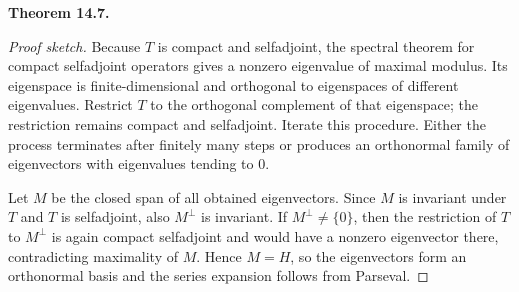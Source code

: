 \documentclass[11pt]{article}
\newenvironment{theoremstmt}[1]{%
  \par\medskip\noindent\textbf{Theorem #1. }\itshape
}{\par\medskip}
\begin{document}
\begin{theoremstmt}{14.7}
\thmHilbertSchmidt
\end{theoremstmt}

\begin{proof}[Proof sketch]
Because $T$ is compact and selfadjoint, the spectral theorem for compact selfadjoint operators gives a nonzero eigenvalue of maximal modulus. Its eigenspace is finite-dimensional and orthogonal to eigenspaces of different eigenvalues. Restrict $T$ to the orthogonal complement of that eigenspace; the restriction remains compact and selfadjoint. Iterate this procedure. Either the process terminates after finitely many steps or produces an orthonormal family of eigenvectors with eigenvalues tending to $0$.

Let $M$ be the closed span of all obtained eigenvectors. Since $M$ is invariant under $T$ and $T$ is selfadjoint, also $M^{\perp}$ is invariant. If $M^{\perp}\neq\{0\}$, then the restriction of $T$ to $M^{\perp}$ is again compact selfadjoint and would have a nonzero eigenvector there, contradicting maximality of $M$. Hence $M=H$, so the eigenvectors form an orthonormal basis and the series expansion follows from Parseval.
\end{proof}
\end{document}
